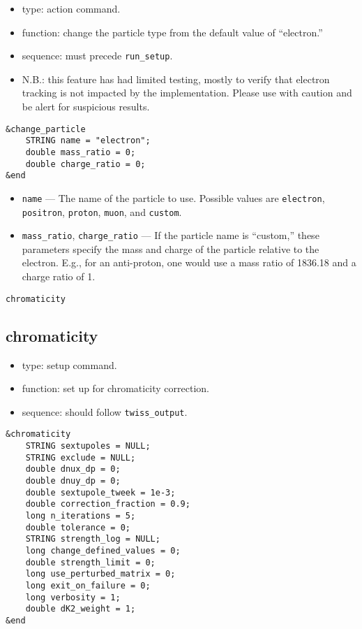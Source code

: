 \documentclass[11pt]{article}
\begin{document}
\begin{itemize}
\item type: action command.
\item function: change the particle type from the default value of ``electron.''
\item sequence: must precede \verb|run_setup|.
\item N.B.: this feature has had limited testing, mostly to verify that electron tracking is not
 impacted by the implementation.  Please use with caution and be alert for suspicious results.
\end{itemize}

\begin{verbatim}
&change_particle
    STRING name = "electron";
    double mass_ratio = 0;
    double charge_ratio = 0;
&end
\end{verbatim}

\begin{itemize}
\item \verb|name| --- The name of the particle to use.  Possible values are \verb|electron|, \verb|positron|,
  \verb|proton|, \verb|muon|, and \verb|custom|.
\item \verb|mass_ratio|, \verb|charge_ratio| --- If the particle name is ``custom,'' these parameters specify the
  mass and charge of the particle relative to the electron.  E.g., for an anti-proton, one would use
  a mass ratio of 1836.18 and a charge ratio of 1.
\end{itemize}

\newpage
\begin{center}{\Large\verb|chromaticity|}\end{center}
\subsection{chromaticity \label{subsec:chromaticity}}

\begin{itemize}
\item type: setup command.
\item function: set up for chromaticity correction.
\item sequence: should follow \verb|twiss_output|.
\end{itemize}

\begin{verbatim}
&chromaticity
    STRING sextupoles = NULL;
    STRING exclude = NULL;
    double dnux_dp = 0;
    double dnuy_dp = 0;
    double sextupole_tweek = 1e-3;
    double correction_fraction = 0.9;
    long n_iterations = 5;
    double tolerance = 0;
    STRING strength_log = NULL;
    long change_defined_values = 0;
    double strength_limit = 0;
    long use_perturbed_matrix = 0;    
    long exit_on_failure = 0;
    long verbosity = 1;
    double dK2_weight = 1;
&end
\end{verbatim}
\end{document}
